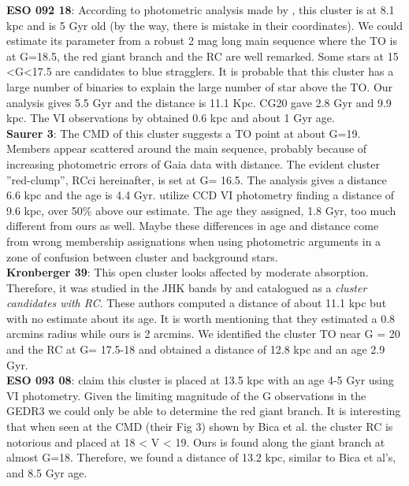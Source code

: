 \documentclass[draft]{aa}
\begin{document}
  \textbf{ESO 092 18}: According to photometric analysis made by \cite{Carraro1995},
  this cluster is at 8.1 kpc and is 5 Gyr old (by the
  way, there is mistake in their coordinates). We could estimate its parameter from a
  robust 2 mag long main sequence where the TO is at G=18.5, the red giant branch
  and the RC are well remarked. Some stars at 15 <G<17.5 are candidates to blue
  stragglers. It is probable that this cluster has a large number of binaries to
  explain the large number of star above the TO. Our analysis gives 5.5 Gyr and
  the distance is 11.1 Kpc.  CG20 gave 2.8 Gyr and 9.9 kpc. The VI observations by
  \cite{Phelps_1994_develop} obtained 0.6 kpc and about 1 Gyr age.\\

  \textbf{Saurer 3}: The CMD of this cluster
  suggests a TO point at about G=19. Members appear
  scattered around the main sequence, probably because of increasing 
  photometric errors of Gaia data with distance. The evident cluster ''red-clump'', RCci
  hereinafter, is set at G= 16.5. The analysis gives a distance 6.6 kpc and the
  age is 4.4 Gyr. \cite{Carraro_2003} utilize CCD VI photometry finding a
  distance of 9.6 kpc, over 50\% above our estimate. The age they assigned, 1.8
  Gyr, too much different from ours as well. Maybe these differences in age and
  distance come from wrong membership assignations when using photometric
  arguments in a zone of confusion between cluster and background stars.\\

  \textbf{Kronberger 39}: This open cluster looks affected by moderate
  absorption. Therefore, it was studied in the JHK bands by \cite{Kronberger_2006}
  and catalogued as a \emph{cluster candidates with RC}. These authors computed a
  distance of about 11.1 kpc but with no estimate about its
  age. It is worth mentioning that they estimated a 0.8 arcmins
  radius while ours is 2 arcmins. We identified the cluster TO near G = 20 and the
  RC at G= 17.5-18 and obtained a distance of 12.8 kpc and an age 2.9 Gyr.\\

  \textbf{ESO 093 08}: \cite{Bica_1999} claim this cluster is placed at 13.5 kpc with an age
  4-5 Gyr using VI photometry. Given the limiting magnitude of the G
  observations in the GEDR3 we could only be able to determine the red giant
  branch. It is interesting that when seen at the CMD (their Fig 3) shown by
  Bica et al.  the cluster RC is notorious and placed at 18 < V < 19. Ours is found
  along the giant branch at almost G=18. Therefore, we found a distance of
  13.2 kpc, similar to Bica et al's, and 8.5 Gyr age. \\
\end{document}
